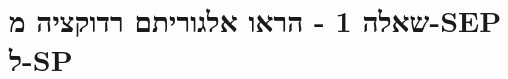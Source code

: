 \documentclass[handout]{beamer}
\newcommand{\E}[1]{\foreignlanguage{english}{\fontspec{Open Sans}#1}}
\begin{document}
\section{שאלה 1 -  הראו אלגוריתם רדוקציה מ-SEP ל-SP }
%
%
%
%	
%	
%
\end{document}
